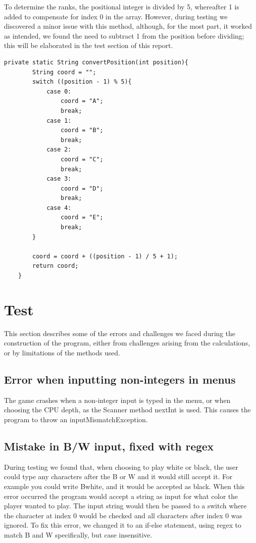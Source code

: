 \documentclass[12pt, a4paper]{article}
\begin{document}
	To determine the ranks, the positional integer is divided by 5, whereafter 1 is added to compensate for index 0 in the array.
	However, during testing we discovered a minor issue with this method, although, for the most part, it worked as intended, we found the need to subtract 1 from the position before dividing; this will be elaborated in the test section of this report.
	
	\begin{lstlisting}[style=JavaStyle]
    private static String convertPosition(int position){
		String coord = "";
		switch ((position - 1) % 5){
			case 0:
				coord = "A";
				break;
			case 1:
				coord = "B";
				break;
			case 2:
				coord = "C";
				break;
			case 3:
				coord = "D";
				break;
			case 4:
				coord = "E";
				break;
		}
		
		coord = coord + ((position - 1) / 5 + 1);
		return coord;
	}
	\end{lstlisting}
	\vspace{10mm}

	\section{Test}
	This section describes some of the errors and challenges we faced during the construction of the program, either from challenges arising from the calculations, or by limitations of the methods used.
	
	\subsection{Error when inputting non-integers in menus}
	The game crashes when a non-integer input is typed in the menu, or when choosing the CPU depth, as the Scanner method nextInt is used. This causes the program to throw an inputMismatchException.
	
	\subsection{Mistake in B/W input, fixed with regex}
	During testing we found that, when choosing to play white or black, the user could type any characters after the B or W and it would still accept it. For example you could write Bwhite, and it would be accepted as black.
	When this error occurred the program would accept a string as input for what color the player wanted to play. The input string would then be passed to a switch where the character at index 0 would be checked and all characters after index 0 was ignored.
	To fix this error, we changed it to an if-else statement, using regex to match B and W specifically, but case insensitive.
	
\end{document}
